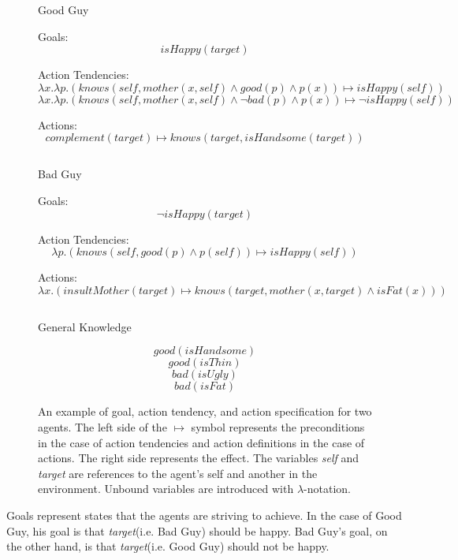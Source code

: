 \documentclass{article}
\begin{document}
\begin{figure}[h!]
  
  \begin{center}
    \large{Good Guy}
  \end{center}
  
  Goals:
  \[
  isHappy(target)
  \]

  Action Tendencies:
  \[
  \lambda x.\lambda p.(knows(self, mother(x,self) \wedge good(p) \wedge p(x)) \mapsto isHappy(self))
  \]
  \[
  \lambda x.\lambda p.(knows(self, mother(x,self) \wedge \neg bad(p) \wedge p(x)) \mapsto \neg isHappy(self))
  \]

  Actions:
  \[
  complement(target) \mapsto knows(target, isHandsome(target))
  \]

  \[\]

  \begin{center}
    \large{Bad Guy}
  \end{center}
  
  Goals:
  \[
  \neg isHappy(target)
  \]

  Action Tendencies:
  \[
  \lambda p.(knows(self, good(p) \wedge p(self)) \mapsto isHappy(self))
  \]

  Actions:
  \[
  \lambda x.(insultMother(target) \mapsto knows(target, mother(x, target) \wedge
  isFat(x))) 
  \]
  
  \[\]

  \begin{center} \large{General Knowledge} \end{center}

  \[
  good(isHandsome)
  \]
  \[
  good(isThin)
  \]
  \[
  bad(isUgly)
  \]
  \[
  bad(isFat)
  \]

  \caption{An example of goal, action tendency, and action
    specification for two agents.  The left side of the $\mapsto$ symbol
    represents the preconditions in the case of action tendencies and
    action definitions in the case of actions.  The right side
    represents the effect.  The variables \emph{self} and
    \emph{target} are references to the agent's self and another in
    the environment.  Unbound variables are introduced with $\lambda$-notation.}
  \label{example_goals}

\end{figure}

Goals represent states that the agents are striving to achieve.  In
the case of Good Guy, his goal is that \emph{target}(i.e. Bad Guy)
should be happy.  Bad Guy's goal, on the other hand, is that
\emph{target}(i.e. Good Guy) should not be happy.
\end{document}
